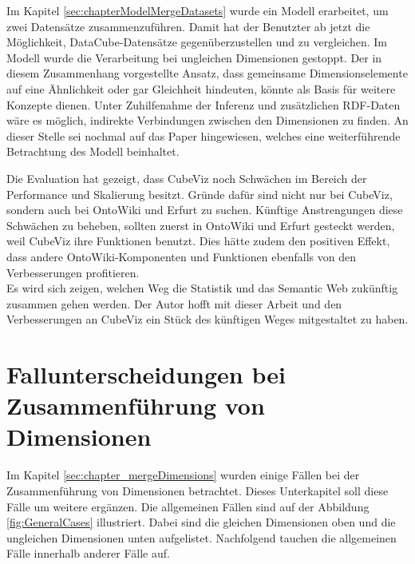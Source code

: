 \documentclass[11pt]{article}
\newcommand{\com}[1]{\marginpar{\em {\small{#1}}}} %
\begin{document}
Im Kapitel \ref{sec:chapterModelMergeDatasets} \com{Kapitel \ref{sec:chapterModelMergeDatasets} \\ S. \pageref{sec:chapterModelMergeDatasets}} wurde ein Modell erarbeitet, um zwei Datensätze zusammenzuführen. Damit hat der Benutzter ab jetzt die Möglichkeit, DataCube-Datensätze gegenüberzustellen und zu vergleichen. Im Modell wurde die Verarbeitung bei ungleichen Dimensionen gestoppt. Der in diesem Zusammenhang vorgestellte Ansatz, dass gemeinsame Dimensionselemente auf eine Ähnlichkeit oder gar Gleichheit hindeuten, könnte als Basis für weitere Konzepte dienen. Unter Zuhilfenahme der Inferenz und zusätzlichen RDF-Daten wäre es möglich, indirekte Verbindungen zwischen den Dimensionen zu finden. An dieser Stelle sei nochmal auf das Paper \cite{CUBEVIZ-FUTUREPAPER} hingewiesen, welches eine weiterführende Betrachtung des Modell beinhaltet. 

Die Evaluation hat gezeigt, dass CubeViz noch Schwächen im Bereich der Performance und Skalierung besitzt. Gründe dafür sind nicht nur bei CubeViz, sondern auch bei OntoWiki und Erfurt zu suchen. Künftige Anstrengungen diese Schwächen zu beheben, sollten zuerst in OntoWiki und Erfurt gesteckt werden, weil CubeViz ihre Funktionen benutzt. Dies hätte zudem den positiven Effekt, dass andere OntoWiki-Komponenten und Funktionen ebenfalls von den Verbesserungen profitieren. \\[0.2cm]

\noindent
Es wird sich zeigen, welchen Weg die Statistik und das Semantic Web zukünftig zusammen gehen werden. Der Autor hofft mit dieser Arbeit und den Verbesserungen an CubeViz ein Stück des künftigen Weges mitgestaltet zu haben.


%
%
\newpage




%
%
\appendix
\newpage
{} %

\section{Fallunterscheidungen bei Zusammenführung von Dimensionen}
\label{sec:Attachement_DimCases}

Im Kapitel \ref{sec:chapter_mergeDimensions} \com{Kapitel \ref{sec:chapter_mergeDimensions} \\ S. \pageref{sec:chapter_mergeDimensions}} wurden einige Fällen bei der Zusammenführung von Dimensionen betrachtet. Dieses Unterkapitel soll diese Fälle um weitere ergänzen. Die allgemeinen Fällen sind auf der Abbildung \ref{fig:GeneralCases} illustriert. Dabei sind die gleichen Dimensionen oben und die ungleichen Dimensionen unten aufgelistet. Nachfolgend tauchen die allgemeinen Fälle innerhalb anderer Fälle auf. \\
\end{document}
